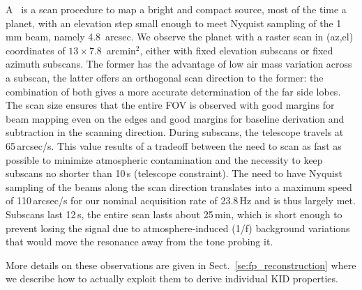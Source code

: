 A \bm\ is a scan procedure to map a bright and compact
source, most of the time a planet, with
an elevation step small enough to meet Nyquist sampling of the 1\,mm beam,
namely 4.8~arcsec. We observe the planet with a raster scan in (az,el)
coordinates of $13\times7.8$~arcmin$^2$, either with fixed elevation subscans or
fixed azimuth subscans. The former has the advantage of low air mass variation
across a subscan, the latter offers an orthogonal scan direction to the former:
the combination of both gives a more accurate determination of the far side
lobes. The scan size ensures that the entire FOV is observed with good margins
for beam mapping even on the edges and good margins for baseline derivation and
subtraction in the scanning direction. During subscans, the telescope travels at
65\,arcsec/s. This value results of a tradeoff between the need to scan as
fast as possible to minimize atmospheric contamination and the
necessity to keep subscans no shorter than 10\,s (telescope
constraint). The need to have Nyquist sampling of
the beams along the scan direction translates into a maximum speed of 110\,arcsec/s
for our nominal acquisition rate of 23.8\,Hz and is thus largely met. Subscans
last 12\,s, the entire scan lasts about 25\,min, which is short enough to prevent
losing the signal due to atmosphere-induced (1/f) background variations that would
move the resonance away from the tone probing it.

More details on these observations are given in Sect.~\ref{se:fp_reconstruction}
where we describe how to actually exploit them to derive individual KID
properties.

